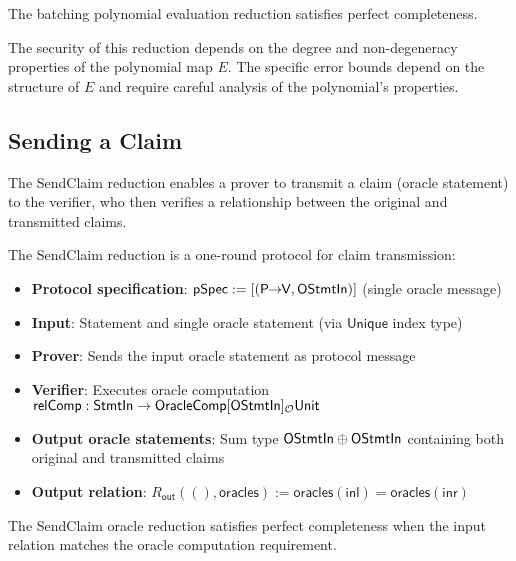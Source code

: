\begin{theorem}
    The batching polynomial evaluation reduction satisfies perfect completeness.
\end{theorem}

\begin{remark}
    The security of this reduction depends on the degree and non-degeneracy properties of the polynomial map $E$. The specific error bounds depend on the structure of $E$ and require careful analysis of the polynomial's properties.
\end{remark}

\subsection{Sending a Claim}

The SendClaim reduction enables a prover to transmit a claim (oracle statement) to the verifier, who then verifies a relationship between the original and transmitted claims.

\begin{definition}
    \label{def:sendclaim_oracle_reduction}
    The SendClaim reduction is a one-round protocol for claim transmission:
    \begin{itemize}
        \item \textbf{Protocol specification}: $\mathsf{pSpec} := [(\mathsf{P \!\!\rightarrow\!\! V}, \mathsf{OStmtIn})]$ (single oracle message)
        \item \textbf{Input}: Statement and single oracle statement (via $\mathsf{Unique}$ index type)
        \item \textbf{Prover}: Sends the input oracle statement as protocol message
        \item \textbf{Verifier}: Executes oracle computation $\mathsf{relComp} : \mathsf{StmtIn} \to \mathsf{OracleComp}[\mathsf{OStmtIn}]_{\mathcal{O}} \mathsf{Unit}$
        \item \textbf{Output oracle statements}: Sum type $\mathsf{OStmtIn} \oplus \mathsf{OStmtIn}$ containing both original and transmitted claims
        \item \textbf{Output relation}: $R_{\mathsf{out}}((), \mathsf{oracles}) := \mathsf{oracles}(\mathsf{inl}) = \mathsf{oracles}(\mathsf{inr})$
    \end{itemize}
\end{definition}

\begin{theorem}
    The SendClaim oracle reduction satisfies perfect completeness when the input relation matches the oracle computation requirement.
\end{theorem}

